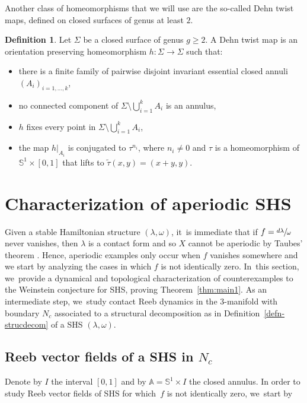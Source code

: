\documentclass[11pt]{article}
\newcommand{\threemanifold}{$3$\nobreakdash-mani\-fold\xspace}
\theoremstyle{definition}
\newtheorem{defi}[theorem]{Definition}
\newcommand{\mS}{\mathbb{S}}
\begin{document}
Another class of homeomorphisms that we will use are the so-called Dehn twist maps, defined on closed surfaces of genus at least $2$.
\begin{defi}
Let $\Sigma$ be a closed surface of genus $g\geq 2$. A Dehn twist map is an orientation preserving homeomorphism $h:\Sigma \to \Sigma$ such that:
\begin{itemize}
\item
there is a finite family of pairwise disjoint invariant essential closed annuli $(A_i)_{i=1,\dots,k}$,
\item
no connected component of $\Sigma\setminus \bigcup_{i=1}^k A_i$ is an annulus,
\item
$h$ fixes every point in $\Sigma \setminus \bigcup_{i=1}^k A_i$,
\item
the map $h|_{A_i}$ is conjugated to $\tau^{n_i}$, where $n_i\neq 0$ and $\tau$ is a homeomorphism of $\mS^1\times [0,1]$ that lifts to $\widetilde \tau (x,y)=(x+y,y)$.
\end{itemize}
\end{defi}

\section{Characterization of aperiodic SHS}\label{s:Aper}

Given a stable Hamiltonian structure $(\lambda,\omega)$, it~is immediate that if $f=\sfrac{d\lambda}{\omega}$ never vanishes, then $\lambda$ is a contact form and so $X$ cannot be aperiodic by Taubes' theorem \cite{Taub}. Hence, aperiodic examples only occur when $f$ vanishes somewhere and we start by analyzing the cases in which $f$ is not identically zero. In~this section, we~provide a dynamical and topological characterization of counterexamples to the Weinstein conjecture for SHS, proving Theorem~\ref{thm:main1}. As an intermediate step, we~study contact Reeb dynamics in the \threemanifold with boundary $N_c$ associated to a structural decomposition as in Definition~\ref{defn-strucdecom} of a SHS $(\lambda,\omega)$.

\subsection{Reeb vector fields of a SHS in $N_c$}

Denote by $I$ the interval $[0,1]$ and by $\mathbb{A}=\mS^1\times I$ the closed annulus.
In order to study Reeb vector fields of SHS for which~$f$ is not identically zero, we~start by
\end{document}
